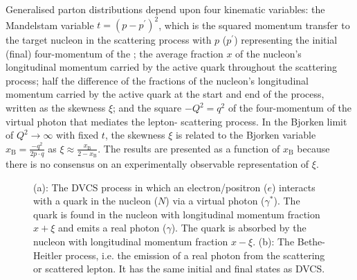 Generalised parton distributions depend upon four kinematic variables: the
Mandelstam variable $t=(p-p^{\prime})^2$, which is the squared momentum
transfer to the target nucleon in the scattering process with $p$ ($p^{\prime}$)
representing the initial (final) four-momentum of the ; the average
fraction $x$ of the nucleon's longitudinal momentum carried by the active
quark throughout the scattering process; half the difference of
  the fractions of the nucleon's longitudinal momentum carried
by the active quark at the start and end of the process, written as
the skewness $\xi$; and the square $-Q^2=q^2$ of the four-momentum of
the virtual photon that mediates the lepton- scattering
process. In the Bjorken limit of $Q^2\rightarrow\infty$ with fixed
$t$, the skewness $\xi$ is related to the Bjorken variable
$x_{\textrm{B}}=\frac{-q^2}{2p\cdot q}$ as
$\xi\approx\frac{x_\textrm{B}}{2-x_\textrm{B}}$. The results are presented
as a function of $x_{\textrm{B}}$ because there is no consensus on an experimentally observable representation of $\xi$. 
\begin{figure}
\begin{center}
\caption[DVCS and Bethe Heitler hand bag diagram.]{(a): The  DVCS process in which an electron/positron ($e$) interacts with a quark in the nucleon
($N$) via a virtual photon ($\gamma^\ast$). The quark is found in the
nucleon with longitudinal momentum fraction $x+\xi$ and emits a real
photon ($\gamma$). The quark is absorbed by the nucleon with
longitudinal momentum fraction $x-\xi$. (b): The  Bethe-Heitler process, i.e. the emission of a real photon from the scattering or
scattered lepton. It has the same initial and final states as DVCS.}
\label{spin}
\end{center}
\end{figure}


